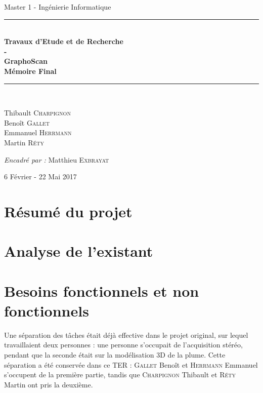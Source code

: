 \documentclass{article}
\begin{document}
\thispagestyle{empty}
\begin{center}
{\large Master 1 - Ingénierie Informatique} \\ [0.5cm]
\vfill
\rule{\linewidth}{0.4mm} \\ [0.4cm]
{\huge \bfseries
Travaux d'Etude et de Recherche\\
- \\
GraphoScan \\ [0.4cm]
Mémoire Final \\ [0.4cm]
}
\rule{\linewidth}{0.4mm} \\ [1.5cm]

\begin{minipage}{0.4\textwidth}
\begin{flushleft} \large
Thibault \textsc{Charpignon} \\
Benoît \textsc{Gallet} \\
Emmanuel \textsc{Herrmann} \\
Martin \textsc{Réty}
\end{flushleft}
\end{minipage}

\vfill

\large\emph{Encadré par : }{Matthieu \textsc{Exbrayat}}

\vfill


{\large 6 Février - 22 Mai 2017}

\end{center}

\newpage
\setcounter{page}{1}
\tableofcontents

\newpage

\section{Résumé du projet}



\section{Analyse de l'existant}



\section{Besoins fonctionnels et non fonctionnels}

	Une séparation des tâches était déjà effective dans le projet original, sur lequel travaillaient deux personnes : une personne s'occupait de l'acquisition stéréo, pendant que la seconde était sur la modélisation 3D de la plume. Cette séparation a été conservée dans ce TER : \textsc{Gallet} Benoît et \textsc{Herrmann} Emmanuel s'occupent de la première partie, tandis que \textsc{Charpignon} Thibault et \textsc{Réty} Martin ont pris la deuxième.
\end{document}

